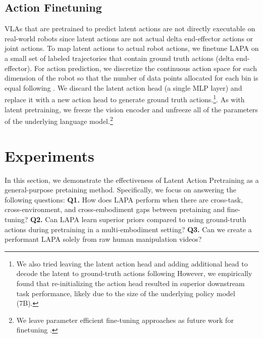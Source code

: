 \documentclass{article} %
\begin{document}
\subsection{Action Finetuning}
VLAs that are pretrained to predict latent actions are not directly executable on real-world robots since latent actions are not actual delta end-effector actions or joint actions. To map latent actions to actual robot actions, we finetune LAPA on a small set of labeled trajectories that contain ground truth actions (delta end-effector). For action prediction, we discretize the continuous action space for each dimension of the robot so that the number of data points allocated for each bin is equal following \citet{kim2024OpenVLA, brohan2023rt}. We discard the latent action head (a single MLP layer) and replace it with a new action head to generate ground truth actions.\footnote{We also tried leaving the latent action head and adding additional head to decode the latent to ground-truth actions following \citet{schmidt2024learning} However, we empirically found that re-initializing the action head resulted in superior downstream task performance, likely due to the size of the underlying policy model (7B).}. 
As with latent pretraining, we freeze the vision encoder and unfreeze all of the parameters of the underlying language model.\footnote{We leave parameter efficient fine-tuning approaches as future work for finetuning \citep{hu2022lora}.}

\section{Experiments}
In this section, we demonstrate the effectiveness of Latent Action Pretraining as a general-purpose pretaining method. Specifically, we focus on answering the following questions: \textbf{Q1.} How does LAPA perform when there are cross-task, cross-environment, and cross-embodiment gaps between pretaining and fine-tuning? \textbf{Q2.} Can LAPA learn superior priors compared to using ground-truth actions during pretraining in a multi-embodiment setting? \textbf{Q3.} Can we create a performant LAPA solely from raw human manipulation videos?
\end{document}
